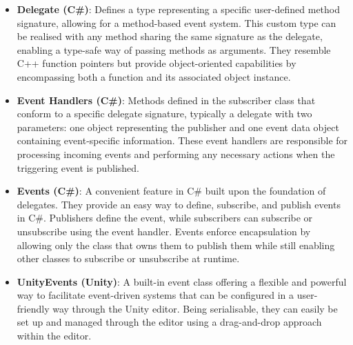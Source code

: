 \begin{itemize}
    \item \textbf{Delegate (C\#)}: Defines a type representing a specific user-defined method signature, allowing for a method-based event system\cite{microsoft-csharp-delegates}. This custom type can be realised with any method sharing the same signature as the delegate, enabling a type-safe way of passing methods as arguments. They resemble C++ function pointers but provide object-oriented capabilities by encompassing both a function and its associated object instance.
    
    \item \textbf{Event Handlers (C\#)}: Methods defined in the subscriber class that conform to a specific delegate signature\cite{microsoft-eventhandler}, typically a delegate with two parameters: one object representing the publisher and one event data object containing event-specific information. These event handlers are responsible for processing incoming events and performing any necessary actions when the triggering event is published.
    
    \item \textbf{Events (C\#)}: A convenient feature in C\# built upon the foundation of delegates\cite{microsoft-csharp-events}. They provide an easy way to define, subscribe, and publish events in C\#. Publishers define the event, while subscribers can subscribe or unsubscribe using the event handler. Events enforce encapsulation by allowing only the class that owns them to publish them while still enabling other classes to subscribe or unsubscribe at runtime.
    
    \item \textbf{UnityEvents (Unity)}: A built-in event class offering a flexible and powerful way to facilitate event-driven systems that can be configured in a user-friendly way through the Unity editor\cite{unity-unityevents}. Being serialisable, they can easily be set up and managed through the editor using a drag-and-drop approach within the editor.
\end{itemize}

